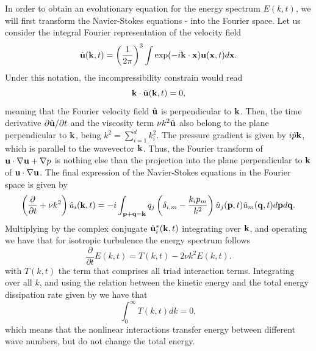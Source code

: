In order to obtain an evolutionary equation for the energy spectrum $E(k,t)$, we will first transform the Navier-Stokes equations - into the Fourier space. Let us consider the integral Fourier representation of the velocity field
$$\hat{{\bf u}}({\bf k},t)=\left(\frac{1}{2\pi}\right)^3\int\exp(-i{\bf k}\cdot{\bf x}){\bf u}({\bf x},t)d{\bf x}.$$
Under this notation, the incompressibility constrain  would read
$${\bf k}\cdot\hat{{\bf u}}({\bf k},t)=0,$$
meaning that the Fourier velocity field $\hat{{\bf u}}$ is perpendicular to ${\bf k}$. Then, the time derivative $\partial\hat{{\bf u}}/\partial t$ and the viscosity term $\nu k^2\hat{{\bf u}}$ also belong to the plane perpendicular to ${\bf k}$, being $k^2=\sum_{i=1}^dk_i^2$. The pressure gradient is given by $i\hat{p}{\bf k}$, which is parallel to the wavevector ${\bf k}$. Thus, the Fourier transform of ${\bf u}\cdot\nabla{\bf u}+\nabla p$ is nothing else than the projection into the plane perpendicular to ${\bf k}$ of ${\bf u}\cdot\nabla{\bf u}$. The final expression of the Navier-Stokes equations in the Fourier space is given by
\begin{equation}
\label{eq-NS_strong_fourier}
\left(\frac{\partial}{\partial t}+\nu k^2\right)\hat{u}_i({\bf k},t)=-i\int_{\mathbf{p}+\mathbf{q}={\bf k}}q_j\left(\delta_{i,m}-\frac{k_ip_m}{k^2}\right)\hat{u}_j(\mathbf{p},t)\hat{u}_m(\mathbf{q},t)d\mathbf{p}d\mathbf{q}.
\end{equation}
Multiplying  by the complex conjugate $\hat{{\bf u}}_i^*({\bf k},t)$ integrating over ${\bf k}$, and operating we have that for isotropic turbulence the energy spectrum follows
\begin{equation}
\label{eq-energy_fourier}
\frac{\partial}{\partial t}E(k,t)=T(k,t)-2\nu k^2E(k,t).
\end{equation}
with $T(k,t)$ the term that comprises all triad interaction terms. Integrating over all $k$, and using the relation between the kinetic energy and the total energy dissipation rate given by  we have that
$$\int_0^\infty T(k,t)dk=0,$$
which means that the nonlinear interactions transfer energy between different wave numbers, but do not change the total energy.

